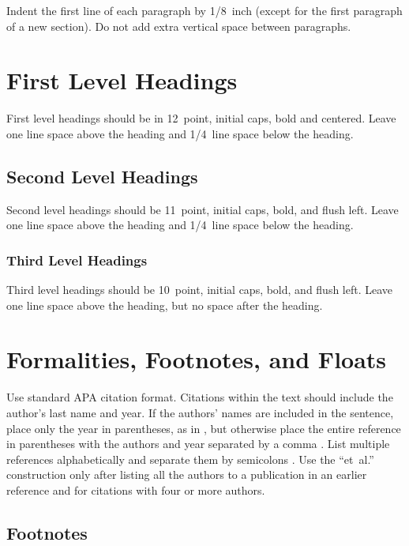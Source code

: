 \documentclass[10pt,letterpaper]{article}
\begin{document}
Indent the first line of each paragraph by 1/8~inch (except for the
first paragraph of a new section). Do not add extra vertical space
between paragraphs.


\section{First Level Headings}

First level headings should be in 12~point, initial caps, bold and
centered. Leave one line space above the heading and 1/4~line space
below the heading.


\subsection{Second Level Headings}

Second level headings should be 11~point, initial caps, bold, and
flush left. Leave one line space above the heading and 1/4~line
space below the heading.


\subsubsection{Third Level Headings}

Third level headings should be 10~point, initial caps, bold, and flush
left. Leave one line space above the heading, but no space after the
heading.


\section{Formalities, Footnotes, and Floats}

Use standard APA citation format. Citations within the text should
include the author's last name and year. If the authors' names are
included in the sentence, place only the year in parentheses, as in
, but otherwise place the entire reference in
parentheses with the authors and year separated by a comma
\cite{NewellSimon1972a}. List multiple references alphabetically and
separate them by semicolons
\cite{ChalnickBillman1988a,NewellSimon1972a}. Use the
``et~al.'' construction only after listing all the authors to a
publication in an earlier reference and for citations with four or
more authors.


\subsection{Footnotes}
\end{document}
